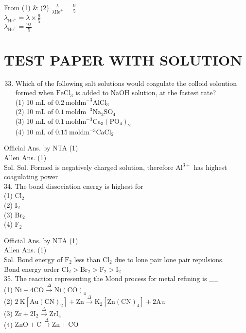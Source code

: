 \documentclass[10pt]{article}
\begin{document}
From (1) \& (2) \(\frac{\lambda}{\lambda \mathrm{He}^{+}}=\frac{9}{5}\)\\
\(\lambda_{\mathrm{He}^{+}}=\lambda \times \frac{9}{5}\)\\
\(\lambda_{\mathrm{He}^{+}}=\frac{9 \lambda}{5}\)

\section*{TEST PAPER WITH SOLUTION}
\begin{enumerate}
  \setcounter{enumi}{32}
  \item Which of the following salt solutions would coagulate the colloid soloution formed when \(\mathrm{FeCl}_{3}\) is added to NaOH solution, at the fastest rate?\\
(1) 10 mL of \(0.2 \mathrm{~mol} \mathrm{dm}^{-3} \mathrm{AlCl}_{3}\)\\
(2) 10 mL of \(0.1 \mathrm{~mol} \mathrm{dm}^{-3} \mathrm{Na}_{2} \mathrm{SO}_{4}\)\\
(3) 10 mL of \(0.1 \mathrm{~mol} \mathrm{dm}^{-3} \mathrm{Ca}_{3}\left(\mathrm{PO}_{4}\right)_{2}\)\\
(4) 10 mL of \(0.15 \mathrm{~mol} \mathrm{dm}{ }^{-3} \mathrm{CaCl}_{2}\)
\end{enumerate}

Official Ans. by NTA (1)\\
Allen Ans. (1)\\
Sol. Sol. Formed is negatively charged solution, therefore \(\mathrm{Al}^{3+}\) has highest coagulating power\\
34. The bond dissociation energy is highest for\\
(1) \(\mathrm{Cl}_{2}\)\\
(2) \(\mathrm{I}_{2}\)\\
(3) \(\mathrm{Br}_{2}\)\\
(4) \(\mathrm{F}_{2}\)

Official Ans. by NTA (1)\\
Allen Ans. (1)\\
Sol. Bond energy of \(\mathrm{F}_{2}\) less than \(\mathrm{Cl}_{2}\) due to lone pair lone pair repulsions.\\
Bond energy order \(\mathrm{Cl}_{2}>\mathrm{Br}_{2}>\mathrm{F}_{2}>\mathrm{I}_{2}\)\\
35. The reaction representing the Mond process for metal refining is \(\_\_\_\_\)\\
(1) \(\mathrm{Ni}+4 \mathrm{CO} \xrightarrow{\Delta} \mathrm{Ni}(\mathrm{CO})_{4}\)\\
(2) \(2 \mathrm{~K}\left[\mathrm{Au}(\mathrm{CN})_{2}\right]+\mathrm{Zn} \xrightarrow{\Delta} \mathrm{K}_{2}\left[\mathrm{Zn}(\mathrm{CN})_{4}\right]+2 \mathrm{Au}\)\\
(3) \(\mathrm{Zr}+2 \mathrm{I}_{2} \xrightarrow{\Delta} \mathrm{Zr} \mathrm{I}_{4}\)\\
(4) \(\mathrm{ZnO}+\mathrm{C} \xrightarrow{\Delta} \mathrm{Zn}+\mathrm{CO}\)
\end{document}
